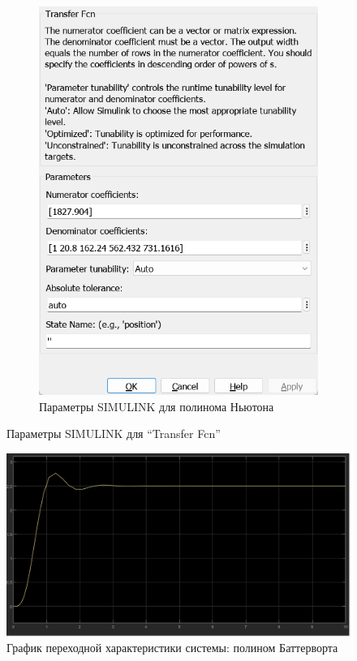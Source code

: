 \documentclass[a4paper, 12pt]{article}
\begin{document}
\begin{figure}[H]
\begin{subfigure}{0.3\textwidth}
            \includegraphics[width=\linewidth]{task1_newton_window.png}
            \caption{Параметры SIMULINK для полинома Ньютона}
            \label{fig:t1nw}
        \end{subfigure}
        \caption{Параметры SIMULINK для ``Transfer Fcn''}
        \label{fig:windows1}
    \end{figure}
    \begin{figure}[H]
        \centering
        \includegraphics[scale=0.3]{task_1_baterwort.jpg}
        \captionsetup{skip=0pt}
        \caption{График переходной характеристики системы: полином Баттерворта}
        \label{fig:t1bat}
    \end{figure}
\end{document}
